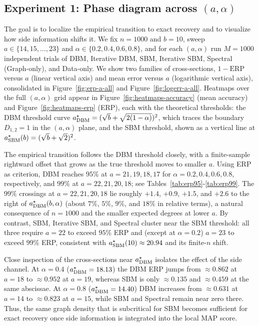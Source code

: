 \documentclass[11pt]{article}
\theoremstyle{plain}
\theoremstyle{definition}
\begin{document}
\subsection{Experiment 1: Phase diagram across $(a,\alpha)$}

The goal is to localize the empirical transition to exact recovery and to visualize how side information shifts it. We fix $n=1000$ and $b=10$, sweep $a\in\{14,15,\dots,23\}$ and $\alpha\in\{0.2,0.4,0.6,0.8\}$, and for each $(a,\alpha)$ run $M=1000$ independent trials of DBM, Iterative DBM, SBM, Iterative SBM, Spectral (Graph-only), and Data-only. We show two families of cross-sections, $1-\mathrm{ERP}$ versus $a$ (linear vertical axis) and mean error versus $a$ (logarithmic vertical axis), consolidated in Figure~\ref{fig:erp-a-all} and Figure~\ref{fig:logerr-a-all}. Heatmaps over the full $(a,\alpha)$ grid appear in Figure~\ref{fig:heatmaps-accuracy} (mean accuracy) and Figure~\ref{fig:heatmaps-erp} (ERP), each with the theoretical thresholds: the DBM threshold curve
$a^\star_{\rm DBM}=(\sqrt{b}+\sqrt{2(1-\alpha)})^2$, which traces the boundary $D_{1,2}=1$ in the $(a,\alpha)$ plane, and the SBM threshold, shown as a vertical line at $a^\star_{\rm SBM}(b) = (\sqrt b+\sqrt 2)^2$.

The empirical transition follows the DBM threshold closely, with a finite-sample rightward offset that grows as the true threshold moves to smaller $a$. Using ERP as criterion, DBM reaches $95\%$ at $a=21,19,18,17$ for $\alpha=0.2,0.4,0.6,0.8$, respectively, and $99\%$ at $a=22,21,20,18$; see Tables~\ref{tab:erp95}-\ref{tab:erp99}. The $99\%$ crossings at $a=22,21,20,18$ lie roughly $+1.4$, $+0.9$, $+1.5$, and $+2.6$ to the right of $a^\star_{\rm DBM}(b,\alpha)$ (about $7\%$, $5\%$, $9\%$, and $18\%$ in relative terms), a natural consequence of $n=1000$ and the smaller expected degrees at lower $a$. By contrast, SBM, Iterative SBM, and Spectral cluster near the SBM threshold: all three require $a=22$ to exceed $95\%$ ERP and (except at $\alpha=0.2$) $a=23$ to exceed $99\%$ ERP, consistent with $a^\star_{\rm SBM}(10)\approx 20.94$ and its finite-$n$ shift.

Close inspection of the cross-sections near $a^\star_{\rm DBM}$ isolates the effect of the side channel. At $\alpha=0.4$ ($a^\star_{\rm DBM}=18.13$) the DBM ERP jumps from $\approx 0.862$ at $a=18$ to $\approx 0.952$ at $a=19$, whereas SBM is only $\approx 0.135$ and $\approx 0.459$ at the same abscissae. At $\alpha=0.8$ ($a^\star_{\rm DBM}=14.40$) DBM increases from $\approx 0.631$ at $a=14$ to $\approx 0.823$ at $a=15$, while SBM and Spectral remain near zero there. Thus, the same graph density that is subcritical for SBM becomes sufficient for exact recovery once side information is integrated into the local MAP score.
\end{document}
